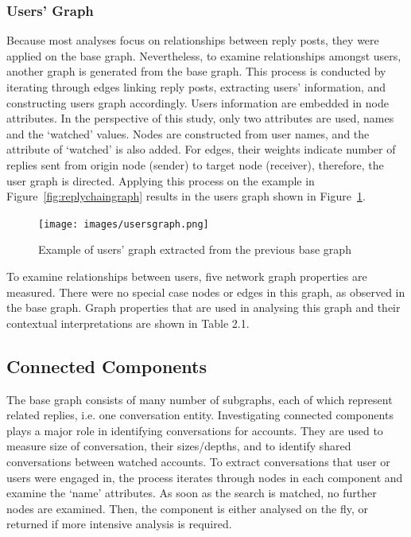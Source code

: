 \documentclass[sigconf]{acmart}
\begin{document}
\subsubsection{Users' Graph}

Because most analyses focus on relationships between reply posts, they
were applied on the base graph. Nevertheless, to examine relationships
amongst users, another graph is generated from the base graph. This
process is conducted by iterating through edges linking reply posts,
extracting users' information, and constructing users graph
accordingly. Users information are embedded in node attributes. In the
perspective of this study, only two attributes are used, names and the
`watched' values. Nodes are constructed from user names, and the
attribute of `watched' is also added. For edges, their weights
indicate number of replies sent from origin node (sender) to target
node (receiver), therefore, the user graph is directed. Applying this
process on the example in Figure~\ref{fig:replychaingraph} results in
the users graph shown in Figure~\ref{fig:usersgraph}.

\begin{figure}[htb]
\centering
\texttt{[image: images/usersgraph.png]}
\caption{Example of users' graph extracted from the previous base graph}
\label{fig:usersgraph}
\end{figure}

To examine relationships between users, five network graph properties
are measured. There were no special case nodes or edges in this graph,
as observed in the base graph. Graph properties that are used in
analysing this graph and their contextual interpretations are shown in
Table ‎2.1.

\subsection{Connected Components}

The base graph consists of many number of subgraphs, each of which
represent related replies, i.e. one conversation entity. Investigating
connected components plays a major role in identifying conversations
for accounts. They are used to measure size of conversation, their
sizes/depths, and to identify shared conversations between watched
accounts. To extract conversations that user or users were engaged in,
the process iterates through nodes in each component and examine the
`name' attributes. As soon as the search is matched, no further nodes
are examined. Then, the component is either analysed on the fly, or
returned if more intensive analysis is required.
\end{document}
